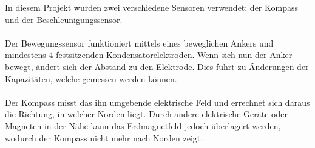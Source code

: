 In diesem Projekt wurden zwei verschiedene Sensoren verwendet: der Kompass und der Beschleunigungssensor.\\
\\
Der Bewegungssensor funktioniert mittels eines beweglichen Ankers und mindestens 4 festsitzenden Kondensatorelektroden. Wenn sich nun der Anker bewegt, ändert sich der Abstand zu den Elektrode. Dies führt zu Änderungen der Kapazitäten, welche gemessen werden können.
\\
\\
Der Kompass misst das ihn umgebende elektrische Feld und errechnet sich daraus die Richtung, in welcher 
Norden liegt. Durch andere elektrische Geräte oder Magneten in der Nähe kann das Erdmagnetfeld jedoch überlagert werden, wodurch der Kompass nicht mehr nach Norden zeigt.


